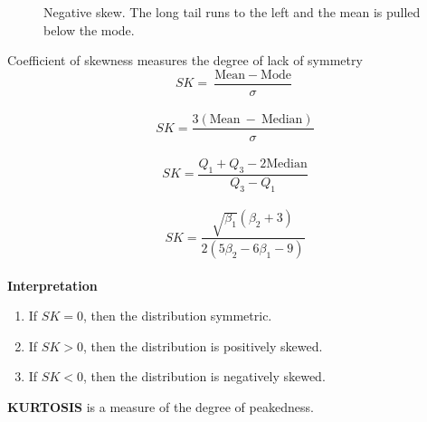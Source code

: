 \documentclass[11pt,a4paper]{article}
\theoremstyle{definition}
\begin{document}
 
 
 
 
 
 
 
 
\vspace{1cm}
 
 
 



\begin{figure}[H]
\centering
{}
\caption{Negative skew. The long tail runs to the left and the mean is pulled below the mode.}
\end{figure}














Coefficient of skewness measures the degree of lack of symmetry
\[SK=\frac{\text{Mean}\ -\ \text{Mode}}{\sigma}\]\\
\[SK=\frac{3(\text{Mean}\ -\  \text{Median})}{\sigma}\]\\
\[SK=\frac{Q_1+Q_3-2\text{Median}}{Q_3-Q_1}\]\\
\[SK=\frac{\sqrt{\beta_1}(\beta_2+3)}{2(5\beta_2-6\beta_1-9)}\]\\



\textbf{Interpretation}
\begin{enumerate}
\item If $SK=0$, then the distribution  symmetric.
\item If $SK>0$, then the distribution is positively skewed.
\item If $SK<0$, then the distribution is negatively skewed.\\
\end{enumerate}

\textbf{KURTOSIS} is a measure of the degree of peakedness.


\end{document}
